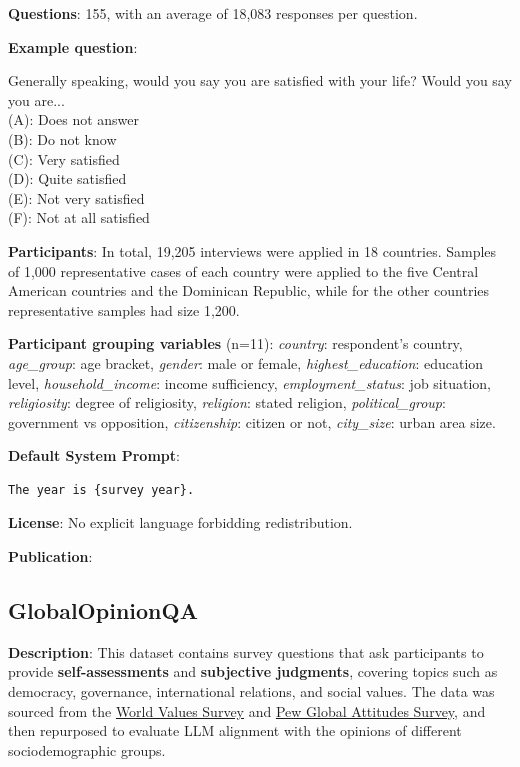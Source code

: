 \documentclass{article} %
\begin{document}
\textbf{Questions}: 155, with an average of 18,083 responses per question.

\textbf{Example question}:

\begin{examplebox}
    Generally speaking, would you say you are satisfied with your life? Would you say you are... \\
    
    (A): Does not answer \\
    (B): Do not know \\
    (C): Very satisfied \\
    (D): Quite satisfied \\
    (E): Not very satisfied \\
    (F): Not at all satisfied
\end{examplebox}

\textbf{Participants}: In total, 19,205 interviews were applied in 18 countries. Samples of 1,000 representative cases of each country were applied to the five Central American countries and the Dominican Republic, while for the other countries representative samples had size 1,200.

\textbf{Participant grouping variables} (n=11):
\textit{country}: respondent’s country,
\textit{age\_group}: age bracket,
\textit{gender}: male or female,
\textit{highest\_education}: education level,
\textit{household\_income}: income sufficiency,
\textit{employment\_status}: job situation,
\textit{religiosity}: degree of religiosity,
\textit{religion}: stated religion,
\textit{political\_group}: government vs opposition,
\textit{citizenship}: citizen or not,
\textit{city\_size}: urban area size.

\textbf{Default System Prompt}:
\begin{examplebox}
\begin{Verbatim}[fontfamily=\rmdefault]
The year is {survey year}.
\end{Verbatim}
\end{examplebox}


\textbf{License}: No explicit language forbidding redistribution.

\textbf{Publication}: \cite{latinobarometro2023}

\subsection{GlobalOpinionQA}

\textbf{Description}: This dataset contains survey questions that ask participants to provide \textbf{self-assessments} and \textbf{subjective judgments}, covering topics such as democracy, governance, international relations, and social values. The data was sourced from the \href{https://www.worldvaluessurvey.org/wvs.jsp}{World Values Survey} and \href{https://www.pewresearch.org/}{Pew Global Attitudes Survey}, and then repurposed to evaluate LLM alignment with the opinions of different sociodemographic groups.
\end{document}
